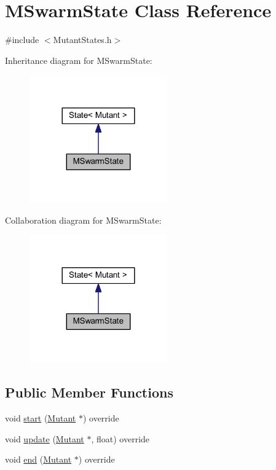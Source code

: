 \hypertarget{class_m_swarm_state}{}\section{M\+Swarm\+State Class Reference}
\label{class_m_swarm_state}


{\ttfamily \#include $<$Mutant\+States.\+h$>$}



Inheritance diagram for M\+Swarm\+State\+:\nopagebreak
\begin{figure}[H]
\begin{center}
\leavevmode
\includegraphics[width=168pt]{class_m_swarm_state__inherit__graph}
\end{center}
\end{figure}


Collaboration diagram for M\+Swarm\+State\+:\nopagebreak
\begin{figure}[H]
\begin{center}
\leavevmode
\includegraphics[width=168pt]{class_m_swarm_state__coll__graph}
\end{center}
\end{figure}
\subsection*{Public Member Functions}
\begin{DoxyCompactItemize}
\item 
void \hyperlink{class_m_swarm_state_a16fbf13f8cb9436570eb97e829befc3e}{start} (\hyperlink{class_mutant}{Mutant} $\ast$) override
\item 
void \hyperlink{class_m_swarm_state_a7e4abd7da613e0a3d013e149c37f8e40}{update} (\hyperlink{class_mutant}{Mutant} $\ast$, float) override
\item 
void \hyperlink{class_m_swarm_state_aa9ac4ceacb0282421abcbf7fa1d6f217}{end} (\hyperlink{class_mutant}{Mutant} $\ast$) override
\end{DoxyCompactItemize}
